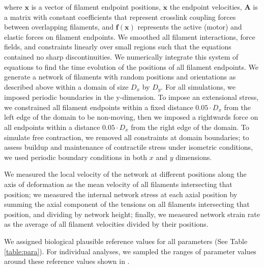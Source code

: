 where $\mathbf{x}$ is a vector of filament endpoint positions, $\mathbf{\dot{x}}$ the endpoint velocities, $\mathbf{A }$ is a matrix with constant coefficients that represent crosslink coupling forces between overlapping filaments, and $\mathbf{f(x)}$ represents the active (motor) and elastic forces on filament endpoints. We smoothed all filament interactions, force fields, and constraints linearly over small regions such that the equations contained no sharp discontinuities. We numerically integrate this system of equations to find the time evolution of the positions of all filament endpoints. We generate a network of filaments with random positions and orientations as described above within a domain of size $D_x$ by $D_y$.  For all simulations, we imposed periodic boundaries in the y-dimension. To impose an extensional stress, we constrained all filament endpoints within a fixed distance $0.05\cdot D_x$ from the left edge of the domain to be non-moving, then we imposed a rightwards force on all endpoints within a distance $0.05\cdot D_x$ from the right edge of the domain.   To simulate free contraction, we removed all constraints at domain boundaries; to assess buildup and maintenance of contractile stress under isometric conditions, we used periodic boundary conditions in both $x$ and $y$ dimensions.

We measured the local velocity of the network at different positions along the axis of deformation as the mean velocity of all filaments intersecting that position; we measured the internal network stress at each axial position by summing the axial component of the tensions on all filaments intersecting that position, and dividing by network height; finally, we measured network strain rate as the average of all filament velocities divided by their positions.

We assigned biological plausible reference values for all parameters (See Table \ref{table:para}).  For individual analyses, we sampled the ranges of parameter values around these reference values shown in .

